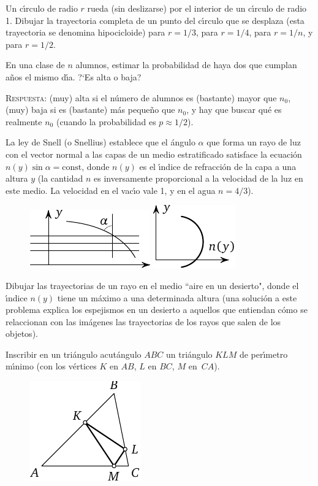 \documentclass[12pt]{article}  %
\begin{document}
\bigskip
{} Un c\'{\i}rculo de radio $r$ rueda (sin deslizarse) por el interior de un c\'{\i}rculo de radio 1.
Dibujar la trayectoria completa de un punto del c\'{\i}rculo que se desplaza (esta trayectoria se denomina hipocicloide) 
para $r=1/3$, para $r=1/4$, para $r=1/n$, y para $r=1/2$.

\bigskip
{} En una clase de $n$ alumnos, estimar la probabilidad de haya dos que cumplan a\~nos el mismo d\'{\i}a. ?`Es alta o baja?

\medskip
\textsc{Respuesta:} (muy) alta si el n\'umero de alumnos es (bastante) mayor que $n_0$,
(muy) baja si es (bastante) m\'as peque\~no que $n_0$, y hay que buscar qu\'e es realmente $n_0$ (cuando la probabilidad es $p \approx 1/2$).

\bigskip
{} La ley de Snell (o Snellius) establece que el \'angulo $\alpha$ que forma un rayo de luz con el vector normal a las capas de un medio estratificado satisface la ecuaci\'on $n(y) \sin \alpha=\text{const}$,
donde $n(y)$ es el \'{\i}ndice de refracci\'on de la capa a una altura $y$ (la cantidad $n$ es 
inversamente proporcional a la velocidad 
de la luz en este medio. La velocidad en el vac\'{\i}o vale 1, y en el agua $n=4/3$).
\begin{figure}[h]
\centering
\includegraphics{taskbook-47}\hskip2cm
\includegraphics{taskbook-471}
\end{figure}

Dibujar las trayectorias de un rayo en el medio ``aire en un desierto", donde el \'{\i}ndice $n(y)$ tiene un m\'aximo 
a una determinada altura
(una soluci\'on a este problema explica los espejismos en un desierto a aquellos que entiendan c\'omo se relaccionan con las im\'agenes las trayectorias de los rayos que salen de los objetos).

\newpage
{} Inscribir en un tri\'angulo acut\'angulo $ABC$ un tri\'angulo $KLM$ de per\'{\i}metro m\'{\i}nimo
(con los v\'ertices $K$ en $AB$, $L$ en $BC$, $M$ en~$CA$).
\begin{figure}[h]
\centering
\includegraphics{taskbook-48} 
\end{figure}
\end{document}
